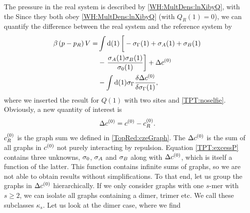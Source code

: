 \documentclass[8.5pt,twoside,twocolumn]{article}
\newcommand\di{\te{d}}
\newcommand\cze{\enmat{c^{(0)}}}
\newcommand\inon{\enmat{\int\di(1)}}
\theoremstyle{standard}
\begin{document}
The pressure in the real system is described by \eqref{WH:MultDens:lnXibyQ}, with the  
Since they both obey \eqref{WH:MultDens:lnXibyQ} (with $Q_R(1)=0$), we can quantify the difference
between the real system and the reference system by
\begin{equation}
\begin{aligned}
\be \rb{p-p_R}V =& \inon \lt[\vphantom{\frac 1 2}-\siga(1)+\si_A(1)+\si_B(1)\rt.\\
&-\lt.\frac{\si_A(1)\si_B(1)}{\siz(1)}\rt] + \Dl\cze \\
&- \inon\siga\delti{\Dl\cze}{\siga(1)},
\end{aligned}
\label{TPT:excessP}
\end{equation}
where we inserted the result for $Q(1)$ with two sites and \eqref{TPT:noselfie}. Obviously, a new
quantity of interest is
\newcommand\chs{\enmat{\cze_{R}}}
\newcommand\dc{\enmat{\Dl\cze}}
\newcommand\dcs{\enmat{\dc[s]}}
\newcommand\dct{\enmat{\dc[2]}}
\begin{equation}
\dc=\cze-\chs.
\end{equation}
$\chs$ is the graph sum we defined in \eqref{TopRed:czeGraph}. The $\Dl\cze$ is the sum of all
graphs in $\cze$ not purely interacting by repulsion. Equation \eqref{TPT:excessP} contains
three unknowns, $\sigma_0$, $\sigma_A$ and $\sigma_B$ along with $\dc$, which is itself a function
of the latter. This function contains infinite sums of graphs, so we are not able to obtain
results without simplifications. To that end, let us group the graphs in $\dc$
hierarchically. If we only consider graphs with one $s$-mer with $s\ge2$, we can
isolate all graphs containing a dimer, trimer etc. We call these subclasses
$\kappa_s$. Let us look at the dimer case, where we find
\newcommand\Hyperpoint[3]{
  \coordinate (L) at (-.5,.5); %
  \coordinate (AB) at (0,.15); %
\draw#1 node[circle,minimum size=.8cm,fill=black,draw] (#2) {};
\draw#1 node[circle,minimum size=.7cm,fill=white,draw] (#2) {};
\draw($(#2)+(AB)$) node[circle,inner sep=0cm,minimum
 size=.1cm,fill=black,draw] (#2A) {};
\draw($(#2)-(AB)$) node[circle,inner sep=0cm,minimum size=.1cm,fill=black,draw]
(#2B) {.};
  \node at ($(#2)+(L)$) {#3};
}
\newcommand\LHyperpoint[4]{
  \coordinate (L) at (-.5,.5); %
  \coordinate (AB) at (0,.15); %
\draw#1 node[circle,minimum size=.8cm,fill=white,draw] (#2) {};
\draw($(#2)+(AB)$) node[circle,inner sep=0cm,minimum
 size=.1cm,fill=black,draw] (#2A) {};
\draw($(#2)-(AB)$) node[circle,inner sep=0cm,minimum size=.1cm,fill=black,draw]
(#2B) {.};
  \node at ($(#2)+(L)$) {#3};
  \node at ($(#2)-(L)$) {#4};
}
\end{document}
